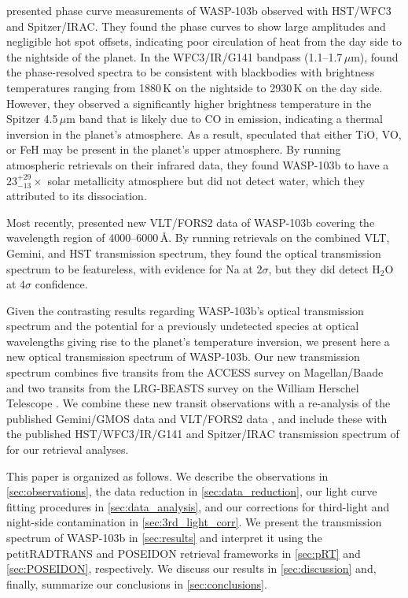 \documentclass[twocolumn]{aastex63}
\begin{document}
\cite{Kreidberg2018} presented phase curve measurements of WASP-103b observed with HST/WFC3 and Spitzer/IRAC. They found the phase curves to show large amplitudes and negligible hot spot offsets, indicating poor circulation of heat from the day side to the nightside of the planet. In the WFC3/IR/G141 bandpass (1.1--1.7\,$\mu$m), \cite{Kreidberg2018} found the phase-resolved spectra to be consistent with blackbodies with brightness temperatures ranging from 1880\,K on the nightside to 2930\,K on the day side. However, they observed a significantly higher brightness temperature in the Spitzer 4.5\,$\mu$m band that is likely due to CO in emission, indicating a thermal inversion in the planet's atmosphere. As a result, \cite{Kreidberg2018} speculated that either TiO, VO, or FeH may be present in the planet's upper atmosphere. By running atmospheric retrievals on their infrared data, they found WASP-103b to have a  $23^{+29}_{-13} \times$ solar metallicity atmosphere but did not detect water, which they attributed to its dissociation.

Most recently, \cite{Wilson2020} presented new VLT/FORS2 data of WASP-103b covering the wavelength region of 4000--6000\,\AA. By running retrievals on the combined VLT, Gemini, and HST transmission spectrum, they found the optical transmission spectrum to be featureless, with evidence for Na at $2\sigma$, but they did detect H$_2$O at $4\sigma$ confidence.

Given the contrasting results regarding WASP-103b's optical transmission spectrum and the potential for a previously undetected species at optical wavelengths giving rise to the planet's temperature inversion, we present here a new optical transmission spectrum of WASP-103b. Our new transmission spectrum combines five transits from the ACCESS survey on Magellan/Baade \citep{Jordan2013,Rackham2017,Bixel2019,Espinoza2019,McGruder2020, Weaver2020,Weaver2021} and two transits from the LRG-BEASTS survey on the William Herschel Telescope \citep{Kirk2017,Kirk2018,Kirk2019,Louden2017,Alderson2020}. We combine these new transit observations with a re-analysis of the published Gemini/GMOS data \citep{Lendl2017} and VLT/FORS2 data \citep{Wilson2020}, and include these with the published HST/WFC3/IR/G141 and Spitzer/IRAC transmission spectrum of \cite{Kreidberg2018} for our retrieval analyses. 

This paper is organized as follows.
We describe the observations in \autoref{sec:observations}, the data reduction in \autoref{sec:data_reduction}, our light curve fitting procedures in \autoref{sec:data_analysis}, and our corrections for third-light and night-side contamination in \autoref{sec:3rd_light_corr}.
We present the transmission spectrum of WASP-103b in \autoref{sec:results} and interpret it using the petitRADTRANS and POSEIDON retrieval frameworks in \autoref{sec:pRT} and \autoref{sec:POSEIDON}, respectively.
We discuss our results in \autoref{sec:discussion} and, finally, summarize our conclusions in \autoref{sec:conclusions}.
\end{document}
